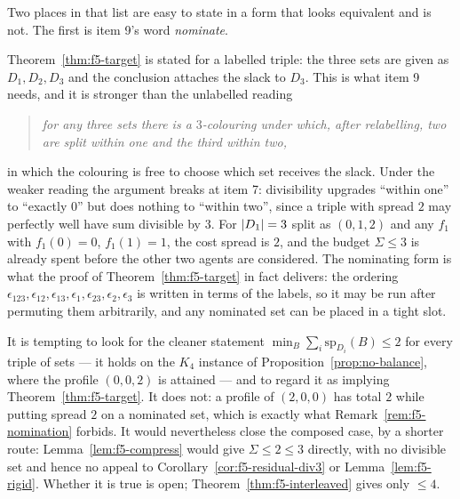 Two places in that list are easy to state in a form that looks equivalent and is
not. The first is item 9's word \emph{nominate}.

\begin{remark}
\label{rem:f5-nomination}
Theorem~\ref{thm:f5-target} is stated for a labelled triple: the three sets are
given as $D_1,D_2,D_3$ and the conclusion attaches the slack to $D_3$. This is
what item 9 needs, and it is stronger than the unlabelled reading
\begin{quote}
  \emph{for any three sets there is a $3$-colouring under which, after relabelling,
  two are split within one and the third within two,}
\end{quote}
in which the colouring is free to choose which set receives the slack. Under the
weaker reading the argument breaks at item 7: divisibility upgrades ``within
one'' to ``exactly $0$'' but does nothing to ``within two'', since a triple with
spread $2$ may perfectly well have sum divisible by $3$. For $\left\lvert D_1\right\rvert = 3$ split
as $(0,1,2)$ and any $f_1$ with $f_1(0)=0$, $f_1(1)=1$, the cost spread is $2$,
and the budget $\Sigma \le 3$ is already spent before the other two agents are
considered. The nominating form is what the proof of
Theorem~\ref{thm:f5-target} in fact delivers: the ordering
$\epsilon_{123},\epsilon_{12},\epsilon_{13},\epsilon_1,\epsilon_{23},\epsilon_2,
\epsilon_3$ is written in terms of the labels, so it may be run after permuting
them arbitrarily, and any nominated set can be placed in a tight slot.
\end{remark}

\begin{remark}
\label{rem:f5-sigma2}
It is tempting to look for the cleaner statement
$\min_B \sum_i \mathrm{sp}_{D_i}(B) \le 2$ for every triple of sets --- it holds
on the $K_4$ instance of Proposition~\ref{prop:no-balance}, where the profile
$(0,0,2)$ is attained --- and to regard it as implying
Theorem~\ref{thm:f5-target}. It does not: a profile of $(2,0,0)$ has total $2$
while putting spread $2$ on a nominated set, which is exactly what
Remark~\ref{rem:f5-nomination} forbids. It would nevertheless close the composed
case, by a shorter route: Lemma~\ref{lem:f5-compress} would give
$\Sigma \le 2 \le 3$ directly, with no divisible set and hence no appeal to
Corollary~\ref{cor:f5-residual-div3} or Lemma~\ref{lem:f5-rigid}. Whether it is
true is open; Theorem~\ref{thm:f5-interleaved} gives only $\le 4$.
\end{remark}

